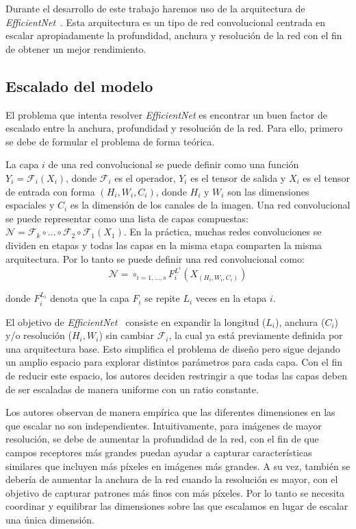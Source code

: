 Durante el desarrollo de este trabajo haremos uso de la arquitectura de \textit{EfficientNet}~\cite{efficientnet}. Esta arquitectura es un tipo de red convolucional centrada en escalar apropiadamente la profundidad, anchura y resolución de la red con el fin de obtener un mejor rendimiento.

\subsection{Escalado del modelo}
El problema que intenta resolver \textit{EfficientNet} es encontrar un buen factor de escalado entre la anchura, profundidad y resolución de la red. Para ello, primero se debe de formular el problema de forma teórica.

La capa $i$ de una red convolucional se puede definir como una función $Y_i=\mathcal{F}_i(X_i)$, donde $\mathcal{F}_i$ es el operador, $Y_i$ es el tensor de salida y $X_i$ es el tensor de entrada con forma $(H_i, W_i, C_i)$, donde $H_i$ y $W_i$ son las dimensiones espaciales y $C_i$ es la dimensión de los canales de la imagen. Una red convolucional se puede representar como una lista de capas compuestas: $\mathcal{N}=\mathcal{F}_k \circ \ldots \circ \mathcal{F}_2 \circ \mathcal{F}_1(X_1)$. En la práctica, muchas redes convoluciones se dividen en etapas y todas las capas en la misma etapa comparten la misma arquitectura. Por lo tanto se puede definir una red convolucional como:
\begin{equation}
    \mathcal{N}=\circ_{i=1,\ldots,s}F_i^{L^i}(X_{(H_i, W_i, C_i)})
\end{equation}

donde $F_i^{L_i}$ denota que la capa $F_i$ se repite $L_i$ veces en la etapa $i$. 

El objetivo de\textit{ EfficientNet}~\cite{efficientnet} consiste en expandir la longitud ($L_i$), anchura ($C_i$) y/o resolución ($H_i, W_i$) sin cambiar $\mathcal{F}_i$, la cual ya está previamente definida por una arquitectura base. Esto simplifica el problema de diseño pero sigue dejando un amplio espacio para explorar distintos parámetros para cada capa. Con el fin de reducir este espacio, los autores deciden restringir a que todas las capas deben de ser escaladas de manera uniforme con un ratio constante.

Los autores observan de manera empírica que las diferentes dimensiones en las que escalar no son independientes. Intuitivamente, para imágenes de mayor resolución, se debe de aumentar la profundidad de la red, con el fin de que campos receptores más grandes puedan ayudar a capturar características similares que incluyen más píxeles en imágenes más grandes. A su vez, también se debería de aumentar la anchura de la red cuando la resolución es mayor, con el objetivo de capturar patrones más finos con más píxeles. Por lo tanto se necesita coordinar y equilibrar las dimensiones sobre las que escalamos en lugar de escalar una única dimensión.

